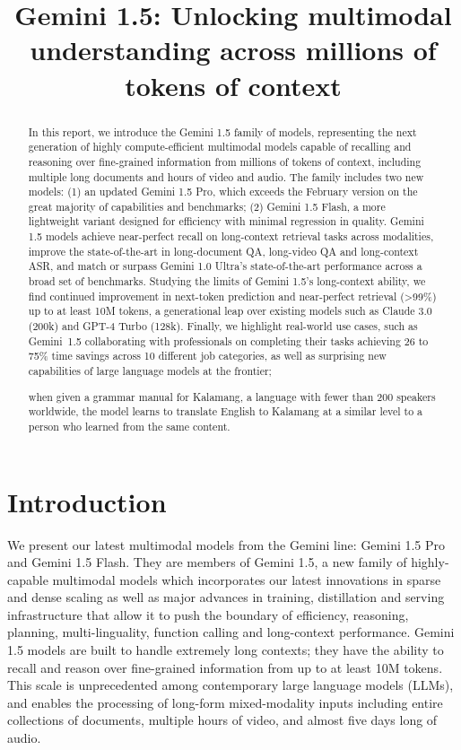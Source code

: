 \title{Gemini 1.5: Unlocking multimodal understanding across millions of tokens of context}

\begin{abstract}
In this report, we introduce the Gemini 1.5 family of models, representing the next generation of highly compute-efficient multimodal models capable of recalling and reasoning over fine-grained information from millions of tokens of context, including multiple long documents and hours of video and audio. The family includes two new models: (1) an updated Gemini 1.5 Pro, which exceeds the February version on the great majority of capabilities and benchmarks; (2) Gemini 1.5 Flash, a more lightweight variant designed for efficiency with minimal regression in quality. Gemini 1.5 models achieve near-perfect recall on long-context retrieval tasks across modalities, improve the state-of-the-art in long-document QA, long-video QA and long-context ASR, and match or surpass Gemini 1.0 Ultra's state-of-the-art performance across a broad set of benchmarks. Studying the limits of Gemini 1.5's long-context ability, we find continued improvement in next-token prediction and near-perfect retrieval (>99\%) up to at least 10M tokens, a generational leap over existing models such as Claude 3.0 (200k) and GPT-4 Turbo (128k). Finally, we highlight real-world use cases, such as Gemini~1.5 collaborating with professionals on completing their tasks achieving 26 to 75\% time savings across 10 different job categories, as well as surprising new capabilities of large language models at the frontier;

when given a grammar manual for Kalamang, a language with fewer than 200 speakers worldwide, the model learns to translate English to Kalamang at a similar level to a person who learned from the same content.
\end{abstract}

\section{Introduction}
\label{sec:intro}

We present our latest multimodal models from the Gemini line: Gemini 1.5 Pro and Gemini 1.5 Flash. They are members of Gemini 1.5, a new family of highly-capable multimodal models which incorporates our latest innovations in sparse and dense scaling as well as major advances in training, distillation and serving infrastructure that allow it to push the boundary of efficiency, reasoning, planning, multi-linguality, function calling and long-context performance. Gemini 1.5 models are built to handle extremely long contexts; they have the ability to recall and reason over fine-grained information from up to at least 10M tokens. This scale is unprecedented among contemporary large language models (LLMs), and enables the processing of long-form mixed-modality inputs including entire collections of documents, multiple hours of video, and almost five days long of audio.

